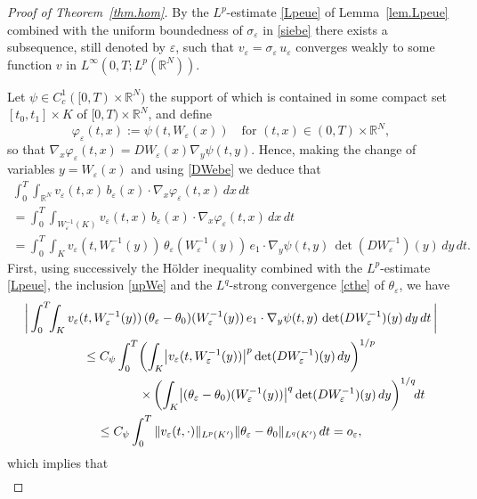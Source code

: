 \documentclass[11pt]{article}
\let \ph \varphi
\def \RR {\mathbb R}
\theoremstyle{plain}
\theoremstyle{definition}
\numberwithin{equation}{section}
\begin{document}
\begin{proof}[Proof of Theorem~\ref{thm.hom}]
By the $L^p$-estimate \eqref{Lpeue} of Lemma~\ref{lem.Lpeue} combined with the uniform boundedness of $\sigma_\varepsilon$ in \eqref{siebe} there exists a subsequence, still denoted by $\varepsilon$, such that $v_\varepsilon=\sigma_\varepsilon\,u_\varepsilon$ converges weakly to some function $v$ in $L^\infty(0,T;L^p(\RR^N))$.

Let $\psi\in C^1_c([0,T)\times\RR^N)$ the support of which is contained in some compact set $[t_0,t_1]\times K$ of $[0,T)\times\RR^N$, and define
\begin{equation}\label{phe}
\ph_\varepsilon(t,x):=\psi(t, W_\varepsilon(x))\quad\mbox{for }(t,x)\in(0,T)\times\RR^N,
\end{equation}
so that $\nabla_x\ph_\varepsilon(t,x)=DW_\varepsilon(x)\nabla_y\psi(t,y)$.
Hence, making the change of variables $y=W_\varepsilon(x)$ and using \eqref{DWebe} we deduce that
\begin{multline}\label{vebe}
\int_0^T\!\!\int_{\RR^N}v_\varepsilon(t,x)\,b_\varepsilon(x)\cdot\nabla_x\ph_\varepsilon(t,x)\,dx\,dt\\
=\int_0^T\!\!\int_{W_\varepsilon^{-1}(K)}v_\varepsilon(t,x)\,b_\varepsilon(x)\cdot\nabla_x\ph_\varepsilon(t,x)\,dx\,dt
\\
=\int_0^T\!\!\int_Kv_\varepsilon(t,W_\varepsilon^{-1}(y))\,\theta_\varepsilon(W_\varepsilon^{-1}(y))\,e_1\cdot\nabla_y\psi(t,y)\,\det(DW_\varepsilon^{-1})(y)\,dy\,dt.
\end{multline}
First, using successively the Hölder inequality combined with the $L^p$-estimate \eqref{Lpeue}, the inclusion \eqref{upWe} and the $L^q$-strong convergence \eqref{cthe} of $\theta_\varepsilon$, we have
\begin{multline*}
\biggl|\,\int_0^T\!\!\int_{K}v_\varepsilon(t,W_\varepsilon^{-1}(y))\,(\theta_\varepsilon-\theta_0)(W_\varepsilon^{-1}(y))\,e_1\cdot\nabla_y\psi(t,y)\,\det(DW_\varepsilon^{-1})(y)\,dy\,dt\,\biggr|
\\
\leq C_\psi \int_0^T\!\left(\int_{K}\!\big|v_\varepsilon(t,W_\varepsilon^{-1}(y))\big|^p\det(DW_\varepsilon^{-1})(y)\,dy\right)^{1/ p}
\\
\shoveright{\times\left(\int_{K}\!\big|(\theta_\varepsilon-\theta_0)(W_\varepsilon^{-1}(y))\big|^q\det(DW_\varepsilon^{-1})(y)\,dy\right)^{1/ q}\!\!dt}
\\
\leq C_\psi\int_0^T\|v_\varepsilon(t,\cdot)\|_{L^p(K')}\|\theta_\varepsilon-\theta_0\|_{L^q(K')}\,dt=o_\varepsilon,
\end{multline*}
which implies that
\begin{multline*}

\end{multline*}
\end{proof}
\end{document}
